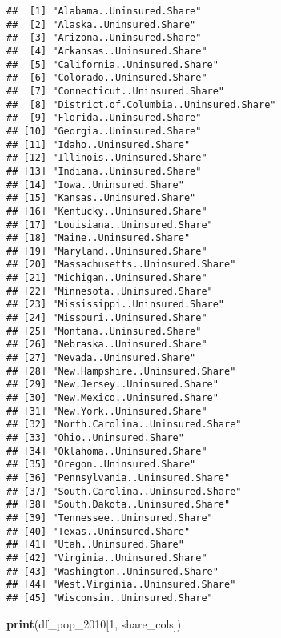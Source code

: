 \documentclass[
]{article}
\newenvironment{Shaded}{\begin{snugshade}}{\end{snugshade}}
\newcommand{\DecValTok}[1]{\textcolor[rgb]{0.00,0.00,0.81}{#1}}
\newcommand{\FunctionTok}[1]{\textcolor[rgb]{0.13,0.29,0.53}{\textbf{#1}}}
\newcommand{\NormalTok}[1]{#1}
\begin{document}
\begin{verbatim}
##  [1] "Alabama..Uninsured.Share"             
##  [2] "Alaska..Uninsured.Share"              
##  [3] "Arizona..Uninsured.Share"             
##  [4] "Arkansas..Uninsured.Share"            
##  [5] "California..Uninsured.Share"          
##  [6] "Colorado..Uninsured.Share"            
##  [7] "Connecticut..Uninsured.Share"         
##  [8] "District.of.Columbia..Uninsured.Share"
##  [9] "Florida..Uninsured.Share"             
## [10] "Georgia..Uninsured.Share"             
## [11] "Idaho..Uninsured.Share"               
## [12] "Illinois..Uninsured.Share"            
## [13] "Indiana..Uninsured.Share"             
## [14] "Iowa..Uninsured.Share"                
## [15] "Kansas..Uninsured.Share"              
## [16] "Kentucky..Uninsured.Share"            
## [17] "Louisiana..Uninsured.Share"           
## [18] "Maine..Uninsured.Share"               
## [19] "Maryland..Uninsured.Share"            
## [20] "Massachusetts..Uninsured.Share"       
## [21] "Michigan..Uninsured.Share"            
## [22] "Minnesota..Uninsured.Share"           
## [23] "Mississippi..Uninsured.Share"         
## [24] "Missouri..Uninsured.Share"            
## [25] "Montana..Uninsured.Share"             
## [26] "Nebraska..Uninsured.Share"            
## [27] "Nevada..Uninsured.Share"              
## [28] "New.Hampshire..Uninsured.Share"       
## [29] "New.Jersey..Uninsured.Share"          
## [30] "New.Mexico..Uninsured.Share"          
## [31] "New.York..Uninsured.Share"            
## [32] "North.Carolina..Uninsured.Share"      
## [33] "Ohio..Uninsured.Share"                
## [34] "Oklahoma..Uninsured.Share"            
## [35] "Oregon..Uninsured.Share"              
## [36] "Pennsylvania..Uninsured.Share"        
## [37] "South.Carolina..Uninsured.Share"      
## [38] "South.Dakota..Uninsured.Share"        
## [39] "Tennessee..Uninsured.Share"           
## [40] "Texas..Uninsured.Share"               
## [41] "Utah..Uninsured.Share"                
## [42] "Virginia..Uninsured.Share"            
## [43] "Washington..Uninsured.Share"          
## [44] "West.Virginia..Uninsured.Share"       
## [45] "Wisconsin..Uninsured.Share"
\end{verbatim}

\begin{Shaded}
\begin{Highlighting}[]
\FunctionTok{print}\NormalTok{(df\_pop\_2010[}\DecValTok{1}\NormalTok{, share\_cols])}
\end{Highlighting}
\end{Shaded}
\end{document}
